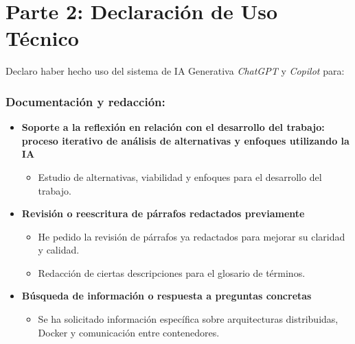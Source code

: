 \section*{Parte 2: Declaración de Uso Técnico}

\noindent Declaro haber hecho uso del sistema de IA Generativa \textit{ChatGPT} y \textit{Copilot} para: 

\subsubsection*{Documentación y redacción:}
\begin{itemize}
    \item \textbf{Soporte a la reflexión en relación con el desarrollo del trabajo: proceso iterativo de análisis de alternativas y enfoques utilizando la IA} 
    \begin{itemize}
        \item Estudio de alternativas, viabilidad y enfoques para el desarrollo del trabajo.
    \end{itemize}
    \item \textbf{Revisión o reescritura de párrafos redactados previamente} 
    \begin{itemize}
        \item He pedido la revisión de párrafos ya redactados para mejorar su claridad y calidad. 
        \item Redacción de ciertas descripciones para el glosario de términos.
    \end{itemize}
    \item \textbf{Búsqueda de información o respuesta a preguntas concretas} 
    \begin{itemize}
        \item Se ha solicitado información específica sobre arquitecturas distribuidas, Docker y comunicación entre contenedores.
    \end{itemize}
\end{itemize}

